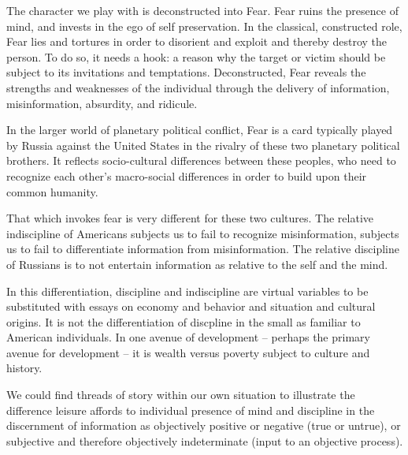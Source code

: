 

The character we play with is deconstructed into Fear.  Fear ruins the
presence of mind, and invests in the ego of self preservation.  In the
classical, constructed role, Fear lies and tortures in order to
disorient and exploit and thereby destroy the person.  To do so, it
needs a hook: a reason why the target or victim should be subject to
its invitations and temptations.  Deconstructed, Fear reveals the
strengths and weaknesses of the individual through the delivery of
information, misinformation, absurdity, and ridicule.

In the larger world of planetary political conflict, Fear is a card
typically played by Russia against the United States in the rivalry of
these two planetary political brothers.  It reflects socio-cultural
differences between these peoples, who need to recognize each other's
macro-social differences in order to build upon their common humanity.

That which invokes fear is very different for these two cultures.  The
relative indiscipline of Americans subjects us to fail to recognize
misinformation, subjects us to fail to differentiate information from
misinformation.  The relative discipline of Russians is to not
entertain information as relative to the self and the mind.  

In this differentiation, discipline and indiscipline are virtual
variables to be substituted with essays on economy and behavior and
situation and cultural origins.  It is not the differentiation of
discpline in the small as familiar to American individuals.  In one
avenue of development -- perhaps the primary avenue for development --
it is wealth versus poverty subject to culture and history.  

We could find threads of story within our own situation to illustrate
the difference leisure affords to individual presence of mind and
discipline in the discernment of information as objectively positive
or negative (true or untrue), or subjective and therefore objectively
indeterminate (input to an objective process).

\bye
